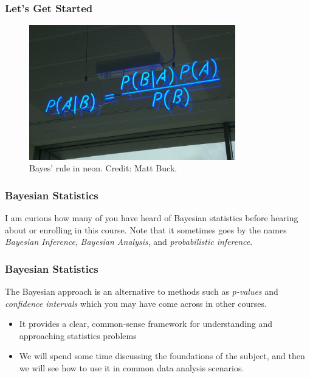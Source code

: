 \documentclass{beamer}
\begin{document}
\begin{frame}
\frametitle{Let's Get Started}

\begin{figure}[!h]
\centering
\includegraphics[width=0.8\textwidth]{images/neon.png}
\caption{Bayes' rule in neon. Credit: Matt Buck.}
\end{figure}

\end{frame}


\begin{frame}
\frametitle{Bayesian Statistics}
I am curious how many of you have heard of Bayesian statistics before
hearing about or enrolling in this course. Note that it sometimes goes by the
names {\em Bayesian Inference}, {\em Bayesian Analysis}, and
{\em probabilistic inference}.


\end{frame}

\begin{frame}
\frametitle{Bayesian Statistics}
The Bayesian approach is an alternative to methods such as
{\em p-values} and {\em confidence intervals} which you may have come across
in other courses.\pause

\begin{itemize}
\item It provides a clear, common-sense framework for
understanding and approaching statistics problems\pause
\item We will spend some time discussing the foundations of the
subject, and then we will see how to use it in common data analysis scenarios.
\end{itemize}


\end{frame}
\end{document}
